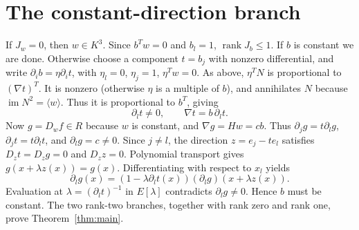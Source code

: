 \documentclass[11pt,a4paper]{article}
\newcommand{\rank}{\operatorname{rank}}
\newcommand{\im}{\operatorname{im}}
\begin{document}
\section{The constant-direction branch}
If $J_w=0$, then $w\in K^3$. Since $b^Tw=0$ and $b_l=1$, $\rank J_b\le1$. If $b$ is constant we are done. Otherwise choose a component $t=b_j$ with nonzero differential, and write $\partial_i b=\eta\partial_i t$, with $\eta_l=0$, $\eta_j=1$, $\eta^Tw=0$. As above, $\eta^TN$ is proportional to $(\nabla t)^T$. It is nonzero (otherwise $\eta$ is a multiple of $b$), and annihilates $N$ because $\im N^2=\langle w\rangle$. Thus it is proportional to $b^T$, giving
\[
 \partial_l t\ne0,\qquad \nabla t=b\,\partial_lt.
\]
Now $g=D_wf\in R$ because $w$ is constant, and $\nabla g=Hw=cb$. Thus $\partial_jg=t\partial_lg$, $\partial_jt=t\partial_lt$, and $\partial_lg=c\ne0$. Since $j\ne l$, the direction $z=e_j-te_l$ satisfies $D_zt=D_zg=0$ and $D_zz=0$. Polynomial transport gives $g(x+\lambda z(x))=g(x)$. Differentiating with respect to $x_l$ yields
\[
 \partial_lg(x)=(1-\lambda\partial_lt(x))(\partial_lg)(x+\lambda z(x)).
\]
Evaluation at $\lambda=(\partial_lt)^{-1}$ in $E[\lambda]$ contradicts $\partial_lg\ne0$. Hence $b$ must be constant. The two rank-two branches, together with rank zero and rank one, prove Theorem~\ref{thm:main}.
\end{document}
